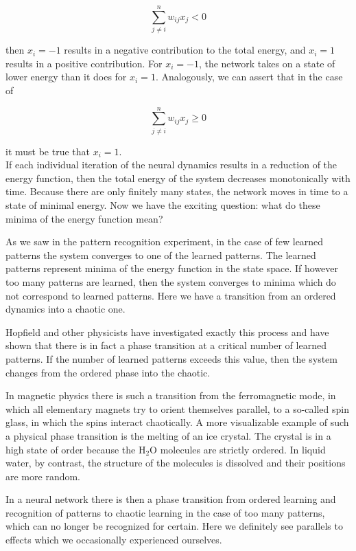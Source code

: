 \documentclass[10pt]{book}
\begin{document}
$$
\sum_{j \neq i}^{n} w_{i j} x_{j}<0
$$

then $x_{i}=-1$ results in a negative contribution to the total energy, and $x_{i}=1$ results in a positive contribution. For $x_{i}=-1$, the network takes on a state of lower energy than it does for $x_{i}=1$. Analogously, we can assert that in the case of

$$
\sum_{j \neq i}^{n} w_{i j} x_{j} \geq 0
$$

it must be true that $x_{i}=1$.\\
If each individual iteration of the neural dynamics results in a reduction of the energy function, then the total energy of the system decreases monotonically with time. Because there are only finitely many states, the network moves in time to a state of minimal energy. Now we have the exciting question: what do these minima of the energy function mean?

As we saw in the pattern recognition experiment, in the case of few learned patterns the system converges to one of the learned patterns. The learned patterns represent minima of the energy function in the state space. If however too many patterns are learned, then the system converges to minima which do not correspond to learned patterns. Here we have a transition from an ordered dynamics into a chaotic one.

Hopfield and other physicists have investigated exactly this process and have shown that there is in fact a phase transition at a critical number of learned patterns. If the number of learned patterns exceeds this value, then the system changes from the ordered phase into the chaotic.

In magnetic physics there is such a transition from the ferromagnetic mode, in which all elementary magnets try to orient themselves parallel, to a so-called spin glass, in which the spins interact chaotically. A more visualizable example of such a physical phase transition is the melting of an ice crystal. The crystal is in a high state of order because the $\mathrm{H}_{2} \mathrm{O}$ molecules are strictly ordered. In liquid water, by contrast, the structure of the molecules is dissolved and their positions are more random.

In a neural network there is then a phase transition from ordered learning and recognition of patterns to chaotic learning in the case of too many patterns, which can no longer be recognized for certain. Here we definitely see parallels to effects which we occasionally experienced ourselves.
\end{document}

